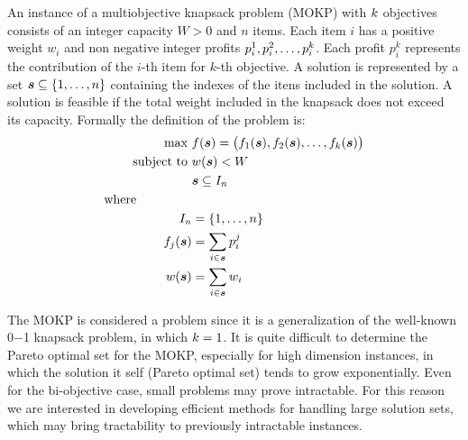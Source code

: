An instance of a multiobjective knapsack problem (MOKP) with $k$
objectives consists of an integer capacity $W > 0$ and $n$ items.
Each item $i$ has a positive weight $w_i$ and non negative integer
profits $p_i^1, p_i^2, \ldots, p_{i}^{k}$.
Each profit $p_i^k$ represents the contribution of the $i$-th item for $k$-th objective.
A solution is represented by a set $\boldsymbol{s} \subseteq \{1, \ldots, n\}$
containing the indexes of the itens included in the solution.
A solution is feasible if the total weight included in the knapsack does
not exceed its capacity.
Formally the definition of the problem is:
\begin{align*}
    \text{max   } & f(\boldsymbol{s}) = 
      \big(f_1(\boldsymbol{s}) ,f_2(\boldsymbol{s}) ,\ldots ,f_{k}(\boldsymbol{s})\big) \\
    \text{subject to   } & w(\boldsymbol{s}) < W \\
    & \boldsymbol{s} \subseteq I_n\\
    \text{where} \phantom{mmmmm} \\
    I_n &= \{1, \ldots, n\}\\
    f_j(\boldsymbol{s}) &= \sum_{i \in \boldsymbol{s}} p^j_i\\
    w(\boldsymbol{s}) &= \sum_{i \in \boldsymbol{s}} w_i
\end{align*}

The MOKP is considered a \nphard{} problem since it is a generalization
of the well-known 0$-$1 knapsack problem, in which $k = 1$.
It is quite difficult to determine the Pareto optimal set for the MOKP,
especially for high dimension instances, in which the solution it self
(Pareto optimal set) tends to grow exponentially.
Even for the bi-objective case, small problems may prove intractable.
For this reason we are interested in developing efficient methods for
handling large solution sets, which may bring tractability to previously
intractable instances.

